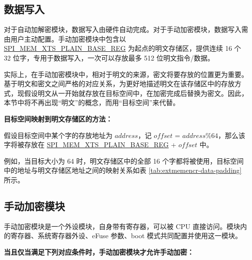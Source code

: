 \documentclass[main\_\_CN.tex]{subfiles}
\begin{document}
\subsection{数据写入}
\label{sec:extmemncr-data-writing}

对于自动加解密模块，数据写入由硬件自动完成。对于手动加密模块，数据写入需由用户主动配置。手动加密模块中包含以 \hyperref[regdesc:SPIMEMXTSPLAINBASEREG]{SPI\_MEM\_XTS\_PLAIN\_BASE\_REG} 为起点的明文存储区，提供连续 16 个 32 位字，专用于数据写入，一次可以存放最多 512 位明文指令/数据。

实际上，在手动加密模块中，相对于明文的来源，密文将要存放的位置更为重要。基于明文和密文之间严格的对应关系，为更好地描述明文在该存储区中的存放方式，现假设明文从一开始就存放在目标空间中，在加密完成后替换为密文。因此，本节中将不再出现“明文”的概念，而用“目标空间”来代替。

{\bfseries 目标空间映射到明文存储区的方法：}

假设目标空间中某个字的存放地址为 \begin{math} address \end{math}，记 \begin{math}offset\end{math} = \begin{math} address \% 64 \end{math}，那么该字将被存放在 \hyperref[regdesc:SPIMEMXTSPLAINBASEREG]{SPI\_MEM\_XTS\_PLAIN\_BASE\_REG} + \begin{math}offset\end{math} 中。

例如，当目标大小为 64 时，明文存储区中的全部 16 个字都将被使用，目标空间中的地址与明文存储区地址之间的映射关系如表 \ref{tab:extmemencr-data-padding} 所示。



\subsection{手动加密模块}

手动加密模块是一个外设模块，自身带有寄存器，可以被 CPU 直接访问。模块内的寄存器、系统寄存器外设、eFuse 参数、boot 模式共同配置并使用这一模块。

\textbf{当且仅当满足下列对应条件时，手动加密模块才允许手动加密：}
\end{document}
